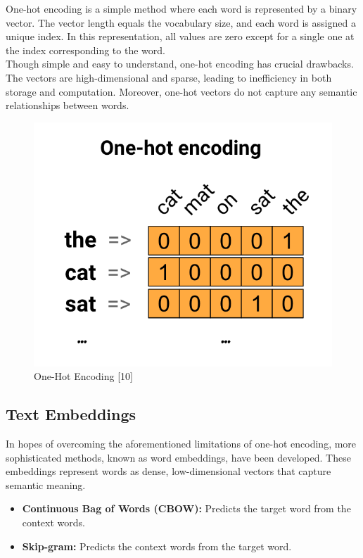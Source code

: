 \documentclass{article}
\begin{document}
One-hot encoding is a simple method where each word is represented by a binary vector. The vector length equals the vocabulary size, and each word is assigned a unique index. In this representation, all values are zero except for a single one at the index corresponding to the word. \\


Though simple and easy to understand, one-hot encoding has crucial drawbacks. The vectors are high-dimensional and sparse, leading to inefficiency in both storage and computation. Moreover, one-hot vectors do not capture any semantic relationships between words.
\begin{figure}[h]
    \centering
    \includegraphics[width= 0.5 \columnwidth]{"one-hot-encoding.png"}
    \caption{One-Hot Encoding [10]}
\end{figure}



\subsection{Text Embeddings}

In hopes of overcoming the aforementioned limitations of one-hot encoding, more sophisticated methods, known as word embeddings, have been developed. These embeddings represent words as dense, low-dimensional vectors that capture semantic meaning.

\begin{itemize}
    \item \textbf{Continuous Bag of Words (CBOW):} Predicts the target word from the context words.
    \item \textbf{Skip-gram:} Predicts the context words from the target word.
\end{itemize}
\end{document}
